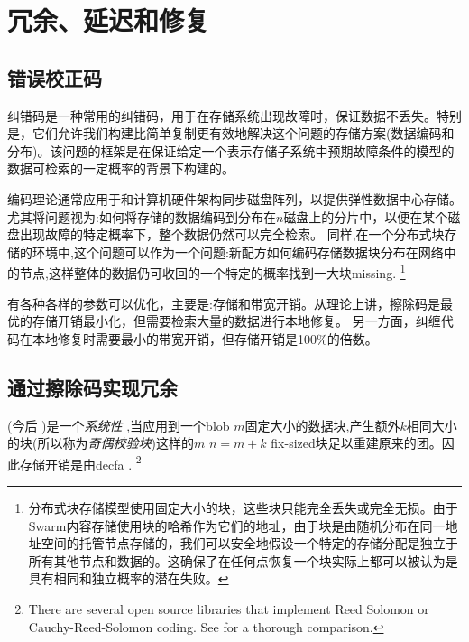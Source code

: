 \section{冗余、延迟和修复\statusgreen}\label{sec:repair}

\green{}

\subsection{错误校正码}\label{sec:error-correcting-codes}

纠错码是一种常用的纠错码，用于在存储系统出现故障时，保证数据不丢失。特别是，它们允许我们构建比简单复制更有效地解决这个问题的存储方案(数据编码和分布)。该问题的框架是在保证给定一个表示存储子系统中预期故障条件的模型的数据可检索的一定概率的背景下构建的。

编码理论通常应用于和计算机硬件架构同步磁盘阵列，以提供弹性数据中心存储。
尤其将问题视为:如何将存储的数据编码到分布在$n$磁盘上的分片中，以便在某个磁盘出现故障的特定概率下，整个数据仍然可以完全检索。
同样,在一个分布式块存储的环境中,这个问题可以作为一个问题:新配方如何编码存储数据块分布在网络中的节点,这样整体的数据仍可收回的一个特定的概率找到一大块missing. %
%
\footnote{分布式块存储模型使用固定大小的块，这些块只能完全丢失或完全无损。由于Swarm内容存储使用块的哈希作为它们的地址，由于块是由随机分布在同一地址空间的托管节点存储的，我们可以安全地假设一个特定的存储分配是独立于所有其他节点和数据的。这确保了在任何点恢复一个块实际上都可以被认为是具有相同和独立概率的潜在失败。}

有各种各样的参数可以优化，主要是:存储和带宽开销。从理论上讲，擦除码是最优的存储开销最小化，但需要检索大量的数据进行本地修复。
另一方面，纠缠代码在本地修复时需要最小的带宽开销，但存储开销是100\%的倍数。 

\subsection{通过擦除码实现冗余\statusgreen}\label{sec:erasure}


(今后 \cite{lubyetal1995CRS} \cite{plank2006optimizing})是一个\emph{系统性} ,当应用到一个blob $m$固定大小的数据块,产生额外$k$相同大小的块(所以称为\emph{奇偶校验块})这样的$m$ $n=m+k$ fix-sized块足以重建原来的团。因此存储开销是由decfa .%
%
\footnote{%
There are several open source libraries that implement Reed Solomon or Cauchy-Reed-Solomon coding. See \cite{plank2009performance} for a thorough comparison.}


